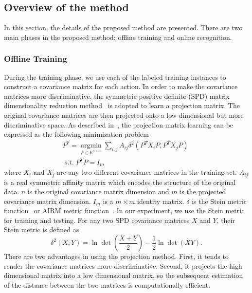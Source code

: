 \documentclass[sigconf]{acmart}
\begin{document}
\subsection{Overview of the method}
\label{Overview}
In this section, the details of the proposed method are presented. There are two main phases in the proposed method: offline training and online recognition.

\subsubsection{Offline Training}
During the training phase, we use each of the labeled training instances to construct a covariance matrix for each action. In order to make the covariance matrices more discriminative, the symmetric positive definite (SPD) matrix dimensionality reduction method~\cite{harandi2014manifold} is adopted to learn a projection matrix. The original covariance matrices are then projected onto a low dimensional but more discriminative space. As described in~\cite{harandi2014manifold}, the projection matrix learning can be expressed as the following minimization problem
\begin{equation}\label{LearningProjectionMat}
\begin{array}{l}
{P^ * } = \mathop {\arg \min }\limits_{P \in {\mathbb{R}^{n \times m}}} \sum\limits_{i,j} {{A_{ij}}} {\delta ^2}\left( {{P^T}{X_i}P,{P^T}{X_j}P} \right)\;\\
\;s.t.\;{P^T}P = {I_m}
\end{array}
\end{equation}
where $X_i$ and $X_j$ are any two different covariance matrices in the training set. $A_{ij}$ is a real symmetric affinity matrix which encodes the structure of the original data. $n$ is the original covariance matrix dimension and $m$ is the projected covariance matrix dimension. $I_m$ is a $m \times m$ identity matrix. $\delta$ is the Stein metric function~\cite{srapositive} or AIRM metric function~\cite{pennec2006riemannian}. In our experiment, we use the Stein metric for training and testing. For any two SPD covariance matrices $X$ and $Y$, their Stein metric is defined as
\begin{equation}\label{SteinMetric}
{\delta ^2}\left( {X,Y} \right) = \ln \det \left( {\frac{{X + Y}}{2}} \right) - \frac{1}{2}\ln \det \left( {XY} \right).
\end{equation}
There are two advantages in using the projection method. First, it tends to render the covariance matrices more discriminative. Second, it projects the high dimensional matrix into a low dimensional matrix, so the subsequent estimation of the distance between the two matrices is computationally efficient.
\end{document}
